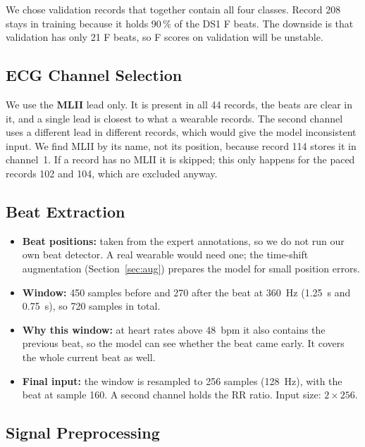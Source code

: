 \documentclass[11pt,a4paper]{article}
\begin{document}
We chose validation records that together contain all four classes. Record 208 stays in training because it holds 90\,\% of the DS1 F beats. The downside is that validation has only 21 F beats, so F scores on validation will be unstable.

\subsection{ECG Channel Selection}

We use the \textbf{MLII} lead only. It is present in all 44 records, the beats are clear in it, and a single lead is closest to what a wearable records. The second channel uses a different lead in different records, which would give the model inconsistent input. We find MLII by its name, not its position, because record 114 stores it in channel~1. If a record has no MLII it is skipped; this only happens for the paced records 102 and 104, which are excluded anyway.

\subsection{Beat Extraction}

\begin{itemize}
  \item \textbf{Beat positions:} taken from the expert annotations, so we do not run our own beat detector. A real wearable would need one; the time-shift augmentation (Section~\ref{sec:aug}) prepares the model for small position errors.
  \item \textbf{Window:} 450 samples before and 270 after the beat at 360~Hz (1.25~s and 0.75~s), so 720 samples in total.
  \item \textbf{Why this window:} at heart rates above 48~bpm it also contains the previous beat, so the model can see whether the beat came early. It covers the whole current beat as well.
  \item \textbf{Final input:} the window is resampled to 256 samples (128~Hz), with the beat at sample 160. A second channel holds the RR ratio. Input size: $2 \times 256$.
\end{itemize}

\subsection{Signal Preprocessing}
\end{document}
